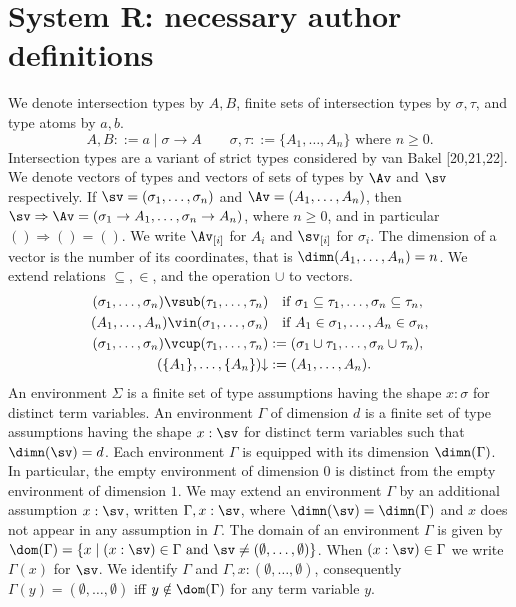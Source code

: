 \section*{System R: necessary author definitions}
We denote intersection types by $A,B$, finite sets of intersection types by $\sigma,\tau$, and type atoms by $a,b$.
\[A,B ::= a\mid\sigma\to A\qquad\sigma,\tau::=\{A_1,\ldots,A_n\}\text{ where }n\geq0.\]
Intersection types are a variant of strict types considered by van Bakel [20,21,22].
We denote vectors of types and vectors of sets of types by $\Av$ and $\sv$ respectively. If $\sv=(\sigma_1,\ldots,\sigma_n)$ and $\Av=(A_1,\ldots,A_n)$, then $\sv\Rightarrow\Av=(\sigma_1\to A_1,\ldots,\sigma_n\to A_n)$, where $n\geq0$, and in particular $()\Rightarrow()=()$. We write $\Av_{[i]}$ for $A_i$ and $\sv_{[i]}$ for $\sigma_i$. The dimension of a vector is the number of its coordinates, that is $\dimn(A_1,\ldots,A_n)=n$. We extend relations $\subseteq,\in$, and the operation $\cup$ to vectors.
\begin{align*}
(\sigma_1,\ldots,\sigma_n)\vsub(\tau_1,\ldots,\tau_n)&\quad\text{if }\sigma_1\subseteq\tau_1,\ldots,\sigma_n\subseteq\tau_n,\\
(A_1,\ldots,A_n)\vin(\sigma_1,\ldots,\sigma_n)&\quad\text{if }A_1\in\sigma_1,\ldots,A_n\in\sigma_n,\\
(\sigma_1,\ldots,\sigma_n)\vcup(\tau_1,\ldots,\tau_n)&:=(\sigma_1\cup\tau_1,\ldots,\sigma_n\cup\tau_n),\\
(\{A_1\},\ldots,\{A_n\})\mathord\downarrow&:=(A_1,\ldots,A_n).
\end{align*}
An environment $\Sigma$ is a finite set of type assumptions having the shape $x:\sigma$ for distinct term variables. An environment $\Gamma$ of dimension $d$ is a finite set of type assumptions having the shape $x:\sv$ for distinct term variables such that $\dimn(\sv)=d$.
Each environment $\Gamma$ is equipped with its dimension $\dimn(\Gamma)$. In particular, the empty environment of dimension $0$ is distinct from the empty environment of dimension $1$.
We may extend an environment $\Gamma$ by an additional assumption $x:\sv$, written $\Gamma,x:\sv$, where $\dimn(\sv)=\dimn(\Gamma)$ and $x$ does not appear in any assumption in $\Gamma$. The domain of an environment $\Gamma$ is given by $\dom(\Gamma)=\{x\mid(x:\sv)\in\Gamma\text{ and }\sv\neq(\emptyset,\ldots,\emptyset)\}$. When $(x:\sv)\in\Gamma$ we write $\Gamma(x)$ for $\sv$. We identify $\Gamma$ and $\Gamma,x:(\emptyset,\ldots,\emptyset)$, consequently $\Gamma(y)=(\emptyset,\ldots,\emptyset)$ iff $y\notin\dom(\Gamma)$ for any term variable $y$.
